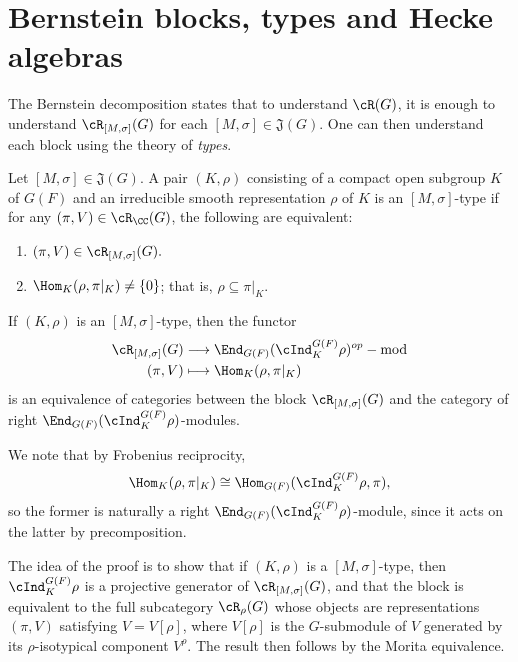 \section{Bernstein blocks, types and Hecke algebras}
    The Bernstein decomposition states that to understand $\cR(G)$, it is enough to understand $\cR_{[M,\sigma]}(G)$ for each $[M,\sigma]\in\mathfrak{J}(G)$. One can then understand each block using the theory of \textit{types}. 
    \begin{definition}
        Let $[M,\sigma]\in\mathfrak{J}(G)$. A pair $(K,\rho)$ consisting of a compact open subgroup $K$ of $G(F)$ and an irreducible smooth representation $\rho$ of $K$ is an $[M,\sigma]$-type if for any $(\pi,V)\in \cR_\CC(G)$, the following are equivalent:
        \begin{enumerate}
            \item $(\pi,V)\in\cR_{[M,\sigma]}(G).$
            \item $\Hom_K(\rho,\pi|_K)\neq\{0\}$; that is, $\rho\subseteq \pi|_K$.
        \end{enumerate}
    \end{definition}

    \begin{theorem}
        If $(K,\rho)$ is an $[M,\sigma]$-type, then the functor 
        \begin{align*}
            \cR_{[M,\sigma]}(G)&\longrightarrow \End_{G(F)}(\cInd_K^{G(F)}\rho)^{op}-\textrm{mod}\\
            (\pi,V)&\longmapsto\Hom_K(\rho,\pi|_K)
        \end{align*}
        is an equivalence of categories between the block $\cR_{[M,\sigma]}(G)$ and the category of right $\End_{G(F)}(\cInd_K^{G(F)}\rho)$-modules. 
    \end{theorem}
    We note that by Frobenius reciprocity, $$\Hom_K(\rho,\pi|_K)\cong\Hom_{G(F)}(\cInd_K^{G(F)}\rho,\pi),$$ so the former is naturally a right $\End_{G(F)}(\cInd_K^{G(F)}\rho)$-module, since it acts on the latter by precomposition.

    The idea of the proof is to show that if $(K,\rho)$ is a $[M,\sigma]$-type, then $\cInd_K^{G(F)}\rho$ is a projective generator of 
    $\cR_{[M,\sigma]}(G)$, and that the block is equivalent to the full subcategory $\cR_\rho(G)$ whose objects are representations $(\pi,V)$ satisfying $V=V[\rho]$, where $V[\rho]$ is the $G$-submodule of $V$ generated by its $\rho$-isotypical component $V^\rho$. The result then follows by the Morita equivalence. 

